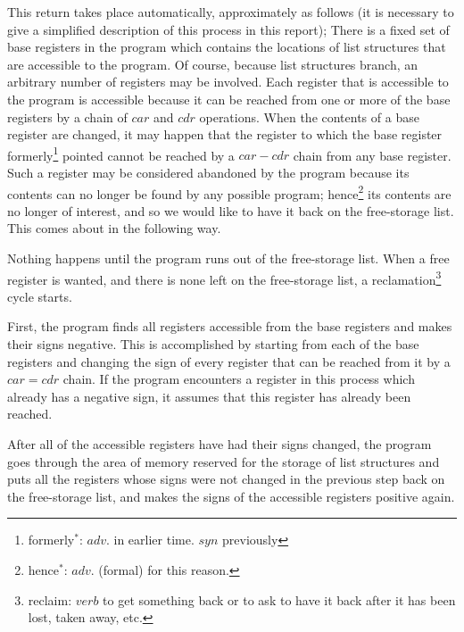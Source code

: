 \documentclass[11pt, a4paper]{article}
\begin{document}
This return takes place automatically, approximately as follows (it is necessary
to give a simplified description of this process in this report); There is a
fixed set of base registers in the program which contains the locations of list
structures that are accessible to the program. Of course, because list
structures branch, an arbitrary number of registers may be involved. Each
register that is accessible to the program is accessible because it can be
reached from one or more of the base registers by a chain of $car$ and $cdr$
operations. When the contents of a base register are changed, it may happen that
the register to which the base register
formerly\footnote{formerly$^*$: $adv.$ in earlier time. $syn$ previously}
pointed cannot be reached by a
$car - cdr$ chain from any base register. Such a register may be considered
abandoned by the program because its contents can no longer be found by any
possible program;
hence\footnote{hence$^*$: $adv.$ (formal) for this reason.}
its contents are no longer of interest, and so we would
like to have it back on the free-storage list. This comes about in the following
way.

Nothing happens until the program runs out of the free-storage list. When a free
register is wanted, and there is none left on the free-storage list, a
reclamation\footnote{reclaim: $verb$ to get something back or to ask to have it
  back after it has been lost, taken away, etc.}
cycle starts.

First, the program finds all registers accessible from the base registers and
makes their signs negative. This is accomplished by starting from each of the
base registers and changing the sign of every register that can be reached from
it by a $car = cdr$ chain. If the program encounters a register in this process
which already has a negative sign, it assumes that this register has already
been reached.

After all of the accessible registers have had their signs changed, the program
goes through the area of memory reserved for the storage of list structures and
puts all the registers whose signs were not changed in the previous step back on
the free-storage list, and makes the signs of the accessible registers positive
again.
\end{document}
